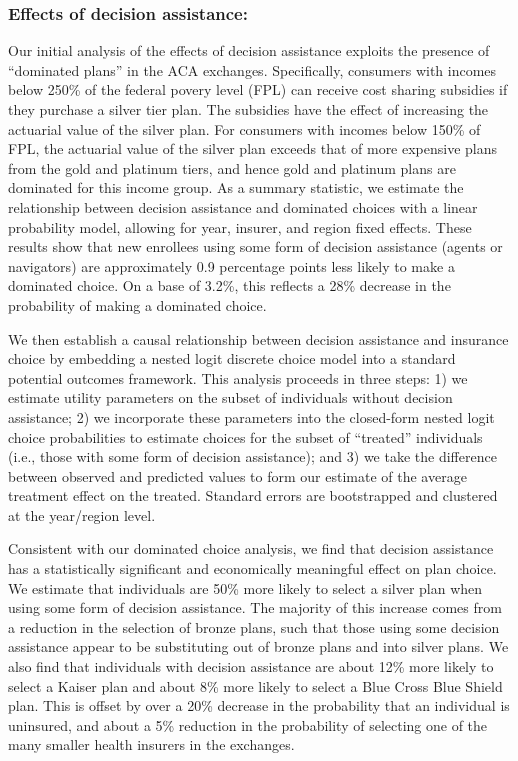 \documentclass[12pt]{article}
\begin{document}
\subsubsection{Effects of decision assistance:}
Our initial analysis of the effects of decision assistance exploits the presence of ``dominated plans'' in the ACA exchanges. Specifically, consumers with incomes below 250\% of the federal povery level (FPL) can receive cost sharing subsidies if they purchase a silver tier plan. The subsidies have the effect of increasing the actuarial value of the silver plan. For consumers with incomes below 150\% of FPL, the actuarial value of the silver plan exceeds that of more expensive plans from the gold and platinum tiers, and hence gold and platinum plans are dominated for this income group. As a summary statistic, we estimate the relationship between decision assistance and dominated choices with a linear probability model, allowing for year, insurer, and region fixed effects. These results show that new enrollees using some form of decision assistance (agents or navigators) are approximately 0.9 percentage points less likely to make a dominated choice. On a base of 3.2\%, this reflects a 28\% decrease in the probability of making a dominated choice.

We then establish a causal relationship between decision assistance and insurance choice by embedding a nested logit discrete choice model into a standard potential outcomes framework. This analysis proceeds in three steps: 1) we estimate utility parameters on the subset of individuals without decision assistance; 2) we incorporate these parameters into the closed-form nested logit choice probabilities to estimate choices for the subset of ``treated'' individuals (i.e., those with some form of decision assistance); and 3) we take the difference between observed and predicted values to form our estimate of the average treatment effect on the treated. Standard errors are bootstrapped and clustered at the year/region level. 

Consistent with our dominated choice analysis, we find that decision assistance has a statistically significant and economically meaningful effect on plan choice. We estimate that individuals are 50\% more likely to select a silver plan when using some form of decision assistance. The majority of this increase comes from a reduction in the selection of bronze plans, such that those using some decision assistance appear to be substituting out of bronze plans and into silver plans. We also find that individuals with decision assistance are about 12\% more likely to select a Kaiser plan and about 8\% more likely to select a Blue Cross Blue Shield plan. This is offset by over a 20\% decrease in the probability that an individual is uninsured, and about a 5\% reduction in the probability of selecting one of the many smaller health insurers in the exchanges.
\end{document}
